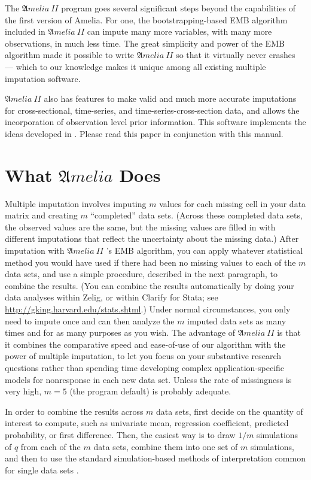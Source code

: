 \documentclass[12pt,titlepage]{article}
\newcommand{\AmeliaII}{\ensuremath{\mathfrak Amelia~II} }
\begin{document}
The \AmeliaII program goes several significant steps beyond the
capabilities of the first version of Amelia.  For one, the
bootstrapping-based EMB algorithm included in \AmeliaII can impute many
more variables, with many more observations, in much less time.  The
great simplicity and power of the EMB algorithm made it possible to
write \AmeliaII so that it virtually never crashes --- which to our
knowledge makes it unique among all existing multiple imputation
software.  

\AmeliaII also has features to make valid and much more accurate
imputations for cross-sectional, time-series, and
time-series-cross-section data, and allows the incorporation of observation level prior information.  This software implements the ideas
developed in \citet*{HonKin06}.  Please read this paper in conjunction
with this manual.

\section{What ${\mathfrak Amelia}$ Does}
\label{sec:what}

Multiple imputation involves imputing $m$ values for each missing cell
in your data matrix and creating $m$ ``completed'' data sets.  (Across
these completed data sets, the observed values are the same, but the
missing values are filled in with different imputations that reflect
the uncertainty about the missing data.)  After imputation with
\AmeliaII's EMB algorithm, you can apply whatever statistical method
you would have used if there had been no missing values to each of the
$m$ data sets, and use a simple procedure, described in the next
paragraph, to combine the results.  (You can combine the results
automatically by doing your data analyses within Zelig, or within
Clarify for Stata; see \url{http://gking.harvard.edu/stats.shtml}.)
Under normal circumstances, you only need to impute once and can then
analyze the $m$ imputed data sets as many times and for as many
purposes as you wish.  The advantage of \AmeliaII is that it combines
the comparative speed and ease-of-use of our algorithm with the power
of multiple imputation, to let you focus on your substantive research
questions rather than spending time developing complex
application-specific models for nonresponse in each new data set.
Unless the rate of missingness is very high, $m = 5$ (the program
default) is probably adequate.

In order to combine the results across $m$ data sets, first decide on
the quantity of interest to compute, such as univariate mean,
regression coefficient, predicted probability, or first difference.
Then, the easiest way is to draw $1/m$ simulations of $q$ from each of
the $m$ data sets, combine them into one set of $m$ simulations, and
then to use the standard simulation-based methods of interpretation
common for single data sets \citep{KinTomWit00}.
\end{document}
